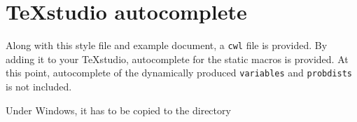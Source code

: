 \documentclass
[
twoside, %
]
{article}
\begin{document}
\section{\TeX studio autocomplete}
Along with this style file and example document, a \texttt{cwl} file is provided. By adding it to your \TeX studio, autocomplete for the static macros is provided. At this point, autocomplete of the dynamically produced \texttt{variables} and \texttt{probdists} is not included.

Under Windows, it has to be copied to the directory  
\end{document}
